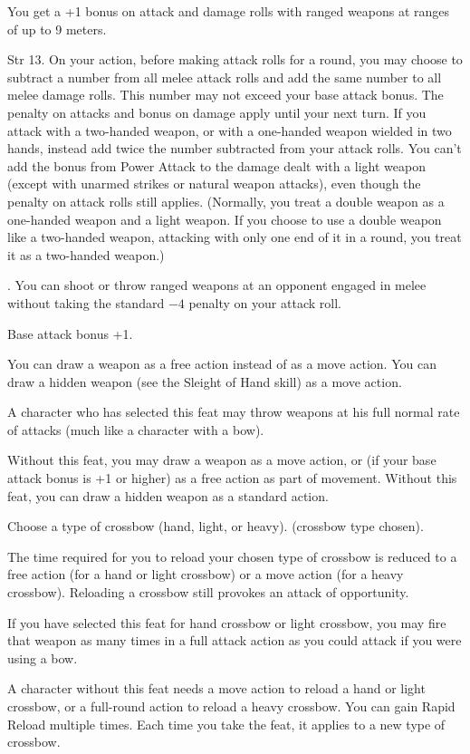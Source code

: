 {}
{You get a +1 bonus on attack and damage rolls with ranged weapons at ranges of up to 9 meters.}

{}
{Str 13.}
{On your action, before making attack rolls for a round, you may choose to subtract a number from all melee attack rolls and add the same number to all melee damage rolls. This number may not exceed your base attack bonus. The penalty on attacks and bonus on damage apply until your next turn.}
{If you attack with a two-handed weapon, or with a one-handed weapon wielded in two hands, instead add twice the number subtracted from your attack rolls. You can't add the bonus from Power Attack to the damage dealt with a light weapon (except with unarmed strikes or natural weapon attacks), even though the penalty on attack rolls still applies. (Normally, you treat a double weapon as a one-handed weapon and a light weapon. If you choose to use a double weapon like a two-handed weapon, attacking with only one end of it in a round, you treat it as a two-handed weapon.)}{}

{.}
{You can shoot or throw ranged weapons at an opponent engaged in melee without taking the standard $-4$ penalty on your attack roll.}

{}
{Base attack bonus +1.}
{You can draw a weapon as a free action instead of as a move action. You can draw a hidden weapon (see the Sleight of Hand skill) as a move action.

A character who has selected this feat may throw weapons at his full normal rate of attacks (much like a character with a bow).}
{Without this feat, you may draw a weapon as a move action, or (if your base attack bonus is +1 or higher) as a free action as part of movement. Without this feat, you can draw a hidden weapon as a standard action.}{}

{Choose a type of crossbow (hand, light, or heavy).}
{ (crossbow type chosen).}
{The time required for you to reload your chosen type of crossbow is reduced to a free action (for a hand or light crossbow) or a move action (for a heavy crossbow). Reloading a crossbow still provokes an attack of opportunity.

If you have selected this feat for hand crossbow or light crossbow, you may fire that weapon as many times in a full attack action as you could attack if you were using a bow.}
{A character without this feat needs a move action to reload a hand or light crossbow, or a full-round action to reload a heavy crossbow.}
{You can gain Rapid Reload multiple times. Each time you take the feat, it applies to a new type of crossbow.}

